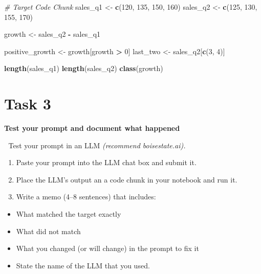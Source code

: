 \documentclass[
  12pt,
]{scrreprt}
\newenvironment{Shaded}{\begin{snugshade}}{\end{snugshade}}
\newcommand{\CommentTok}[1]{\textcolor[rgb]{0.56,0.35,0.01}{\textit{#1}}}
\newcommand{\DecValTok}[1]{\textcolor[rgb]{0.00,0.00,0.81}{#1}}
\newcommand{\FunctionTok}[1]{\textcolor[rgb]{0.13,0.29,0.53}{\textbf{#1}}}
\newcommand{\NormalTok}[1]{#1}
\newcommand{\OtherTok}[1]{\textcolor[rgb]{0.56,0.35,0.01}{#1}}
\newcommand{\SpecialCharTok}[1]{\textcolor[rgb]{0.81,0.36,0.00}{\textbf{#1}}}
\begin{document}
\begin{Shaded}
\begin{Highlighting}[]
\CommentTok{\# Target Code Chunk}
\NormalTok{sales\_q1 }\OtherTok{\textless{}{-}} \FunctionTok{c}\NormalTok{(}\DecValTok{120}\NormalTok{, }\DecValTok{135}\NormalTok{, }\DecValTok{150}\NormalTok{, }\DecValTok{160}\NormalTok{)}
\NormalTok{sales\_q2 }\OtherTok{\textless{}{-}} \FunctionTok{c}\NormalTok{(}\DecValTok{125}\NormalTok{, }\DecValTok{130}\NormalTok{, }\DecValTok{155}\NormalTok{, }\DecValTok{170}\NormalTok{)}

\NormalTok{growth }\OtherTok{\textless{}{-}}\NormalTok{ sales\_q2 }\SpecialCharTok{{-}}\NormalTok{ sales\_q1}

\NormalTok{positive\_growth }\OtherTok{\textless{}{-}}\NormalTok{ growth[growth }\SpecialCharTok{\textgreater{}} \DecValTok{0}\NormalTok{]}
\NormalTok{last\_two }\OtherTok{\textless{}{-}}\NormalTok{ sales\_q2[}\FunctionTok{c}\NormalTok{(}\DecValTok{3}\NormalTok{, }\DecValTok{4}\NormalTok{)]}

\FunctionTok{length}\NormalTok{(sales\_q1)}
\FunctionTok{length}\NormalTok{(sales\_q2)}
\FunctionTok{class}\NormalTok{(growth)}
\end{Highlighting}
\end{Shaded}

\section{Task 3}\label{task-3}

\textbf{Test your prompt and document what happened}

🎯 Test your prompt in an LLM \emph{(recommend boisestate.ai).}

\begin{enumerate}
\def\labelenumi{\arabic{enumi}.}
\item
  Paste your prompt into the LLM chat box and submit it.
\item
  Place the LLM's output an a code chunk in your notebook and run it.
\item
  Write a memo (4--8 sentences) that includes:
\end{enumerate}

\begin{itemize}
\item
  What matched the target exactly
\item
  What did not match
\item
  What you changed (or will change) in the prompt to fix it
\item
  State the name of the LLM that you used.
\end{itemize}
\end{document}
